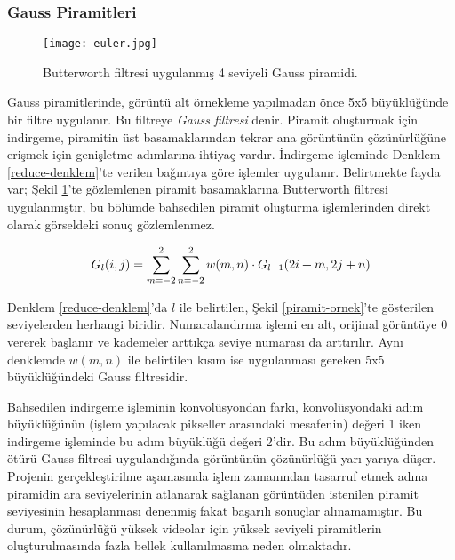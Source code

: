 \documentclass[a4paper, 12pt]{article}
\begin{document}
\subsubsection{Gauss Piramitleri}{\label{gauss-piramit}}

\begin{figure}[h]
	\centering
	\texttt{[image: euler.jpg]}
		\caption{Butterworth filtresi uygulanmış 4 seviyeli Gauss piramidi. }
	\label{ornek-gauss-piramit}
\end{figure}
\vspace{-0.5cm}



Gauss piramitlerinde, görüntü alt örnekleme yapılmadan önce 5x5 büyüklüğünde bir filtre uygulanır. Bu filtreye \textit{Gauss filtresi} denir. Piramit oluşturmak için indirgeme, piramitin üst basamaklarından tekrar ana görüntünün çözünürlüğüne erişmek için genişletme adımlarına ihtiyaç vardır. İndirgeme işleminde Denklem \ref{reduce-denklem}'te verilen bağıntıya göre işlemler uygulanır. Belirtmekte fayda var; Şekil \ref{ornek-gauss-piramit}'te gözlemlenen piramit basamaklarına Butterworth filtresi uygulanmıştır, bu bölümde bahsedilen piramit oluşturma işlemlerinden direkt olarak görseldeki sonuç gözlemlenmez.  


\begin{equation}{\label{reduce-denklem}}
	G_l(i,j) = \sum_{m=-2}^{2} \sum_{n=-2}^{2}w(m,n)\cdot G_{l-1}(2i+m, 2j+n)
\end{equation}

Denklem \ref{reduce-denklem}'da $l$ ile belirtilen, Şekil \ref{piramit-ornek}'te gösterilen seviyelerden herhangi biridir. Numaralandırma işlemi en alt, orijinal görüntüye $0$ vererek başlanır ve kademeler arttıkça seviye numarası da arttırılır. Aynı denklemde $w(m,n)$ ile belirtilen kısım ise uygulanması gereken 5x5 büyüklüğündeki Gauss filtresidir. 


Bahsedilen indirgeme işleminin konvolüsyondan farkı, konvolüsyondaki adım büyüklüğünün (işlem yapılacak pikseller arasındaki mesafenin) değeri 1 iken indirgeme işleminde bu adım büyüklüğü değeri 2'dir. Bu adım büyüklüğünden ötürü Gauss filtresi uygulandığında görüntünün çözünürlüğü yarı yarıya düşer. Projenin gerçekleştirilme aşamasında işlem zamanından tasarruf etmek adına piramidin ara seviyelerinin atlanarak sağlanan görüntüden istenilen piramit seviyesinin hesaplanması denenmiş fakat başarılı sonuçlar alınamamıştır. Bu durum, çözünürlüğü yüksek videolar için yüksek seviyeli piramitlerin oluşturulmasında fazla bellek kullanılmasına neden olmaktadır. 
\end{document}
